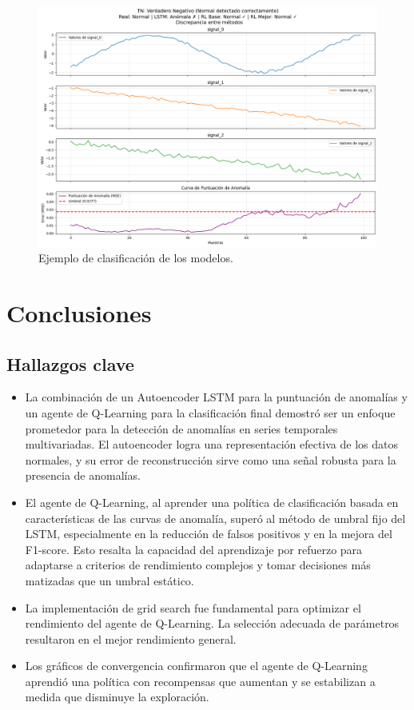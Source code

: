 \documentclass[12pt]{article}
\begin{document}
\begin{figure}[H]
\centering
\includegraphics[width=1\textwidth]{media/classification_example.png}
\caption{Ejemplo de clasificación de los modelos.}
\label{fig:classification_example}
\end{figure}


\bigskip
\section{Conclusiones}
\label{sec:conclusiones}

\subsection{Hallazgos clave}

\begin{itemize}
    \item La combinación de un Autoencoder LSTM para la puntuación de anomalías y un agente de Q-Learning para la clasificación final demostró ser un enfoque prometedor para la detección de anomalías en series temporales multivariadas. El autoencoder logra una representación efectiva de los datos normales, y su error de reconstrucción sirve como una señal robusta para la presencia de anomalías.
    \item El agente de Q-Learning, al aprender una política de clasificación basada en características de las curvas de anomalía, superó al método de umbral fijo del LSTM, especialmente en la reducción de falsos positivos y en la mejora del F1-score. Esto resalta la capacidad del aprendizaje por refuerzo para adaptarse a criterios de rendimiento complejos y tomar decisiones más matizadas que un umbral estático.
    \item La implementación de grid search fue fundamental para optimizar el rendimiento del agente de Q-Learning. La selección adecuada de parámetros resultaron en el mejor rendimiento general.
    \item Los gráficos de convergencia confirmaron que el agente de Q-Learning aprendió una política con recompensas que aumentan y se estabilizan a medida que disminuye la exploración.
\end{itemize}
\end{document}
